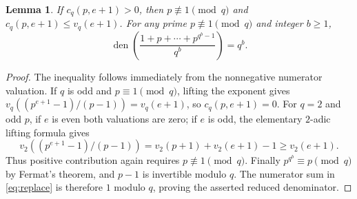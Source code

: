 \documentclass[10pt]{article}
\newtheorem{lemma}{Lemma}
\newcommand{\den}{\operatorname{den}}
\begin{document}
\begin{lemma}\label{lem:positive}
If $c_q(p,e+1)>0$, then $p\not\equiv1\pmod q$ and
$c_q(p,e+1)\le v_q(e+1)$. For any prime $p\not\equiv1\pmod q$ and
integer $b\ge1$,
\begin{equation}\label{eq:replace}
 \den\left(\frac{1+p+\cdots+p^{q^b-1}}{q^b}\right)=q^b.
\end{equation}
\end{lemma}
\begin{proof}
The inequality follows immediately from the nonnegative numerator
valuation. If $q$ is odd and $p\equiv1\pmod q$, lifting the exponent gives
$v_q((p^{e+1}-1)/(p-1))=v_q(e+1)$, so $c_q(p,e+1)=0$.
For $q=2$ and odd $p$, if $e$ is even both valuations are zero; if $e$
is odd, the elementary $2$-adic lifting formula gives
\[
 v_2((p^{e+1}-1)/(p-1))=v_2(p+1)+v_2(e+1)-1\ge v_2(e+1).
\]
Thus positive contribution again requires $p\not\equiv1\pmod q$.
Finally $p^{q^b}\equiv p\pmod q$ by Fermat's theorem, and $p-1$ is
invertible modulo $q$. The numerator sum in \eqref{eq:replace} is
therefore $1$ modulo $q$, proving the asserted reduced denominator.
\end{proof}
\end{document}
